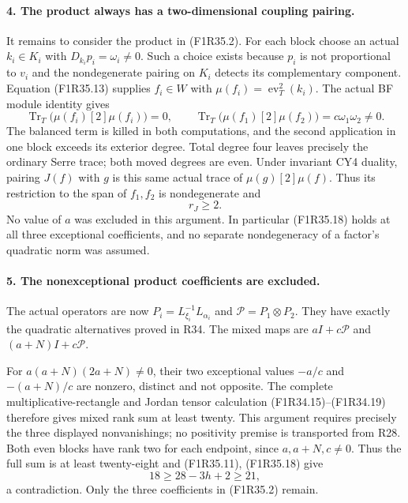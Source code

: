 \paragraph{4. The product always has a two-dimensional coupling pairing.}
It remains to consider the product in (F1R35.2).
For each block choose an actual $k_i\in K_i$ with
$D_{k_i}p_i=\omega_i\ne0$. Such a choice exists because
$p_i$ is not proportional to $v_i$ and the nondegenerate
pairing on $K_i$ detects its complementary component.
Equation (F1R35.13) supplies $f_i\in W$ with
$\mu(f_i)=\operatorname{ev}_T^2(k_i)$.
The actual BF module identity gives
\[
 \operatorname{Tr}_T\bigl(\mu(f_i)[2]\mu(f_i)\bigr)=0,
 \qquad
 \operatorname{Tr}_T\bigl(\mu(f_1)[2]\mu(f_2)\bigr)
                          =c\omega_1\omega_2\ne0.
 \tag{F1R35.17}
\]
The balanced term is killed in both computations,
and the second application in one block exceeds its
exterior degree. Total degree four leaves precisely
the ordinary Serre trace; both moved degrees are even.
Under invariant CY4 duality, pairing $J(f)$ with $g$
is this same actual trace of $\mu(g)[2]\mu(f)$.
Thus its restriction to the span of $f_1,f_2$ is
nondegenerate and
\[
                                r_J\ge2.
 \tag{F1R35.18}
\]
No value of $a$ was excluded in this argument. In
particular (F1R35.18) holds at all three exceptional
coefficients, and no separate nondegeneracy of a
factor's quadratic norm was assumed.

\paragraph{5. The nonexceptional product coefficients are excluded.}
The actual operators are now
$P_i=L_{\xi_i}^{-1}L_{\alpha_i}$ and
$\mathcal P=P_1\otimes P_2$. They have exactly the
quadratic alternatives proved in R34. The mixed maps
are $aI+c\mathcal P$ and $(a+N)I+c\mathcal P$.

For $a(a+N)(2a+N)\ne0$, their two exceptional values
$-a/c$ and $-(a+N)/c$ are nonzero, distinct and not
opposite. The complete multiplicative-rectangle and
Jordan tensor calculation (F1R34.15)--(F1R34.19)
therefore gives mixed rank sum at least twenty.
This argument requires precisely the three displayed
nonvanishings; no positivity premise is transported
from R28. Both even blocks have rank two for each
endpoint, since $a,a+N,c\ne0$. Thus the full sum is
at least twenty-eight and (F1R35.11), (F1R35.18) give
\[
                    18\ge28-3h+2\ge21,
 \tag{F1R35.19}
\]
a contradiction. Only the three coefficients in
(F1R35.2) remain.

